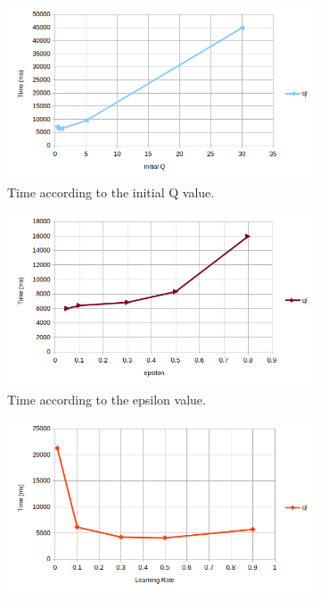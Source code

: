 \documentclass[10pt, twocolumn]{article}
\begin{document}
			\begin{figure}[]
				\centering
				\begin{subfigure}[t]{0.49\textwidth}
					\centering
					\includegraphics[width=\textwidth]{../graphics/GridWorld_qinit_time.png}
					\caption{Time according to the initial Q value.}
					\label{fig:GW:qinit}
				\end{subfigure}
				\begin{subfigure}[t]{0.49\textwidth}
					\centering
					\includegraphics[width=\textwidth]{../graphics/GridWorld_epsilon_time.png}
					\caption{Time according to the epsilon value.}
					\label{fig:GW:epsilon}
				\end{subfigure}
				\begin{subfigure}[t]{0.49\textwidth}
					\centering
					\includegraphics[width=\textwidth]{../graphics/GridWorld_rate_time.png}

\end{subfigure}
\end{figure}
\end{document}
